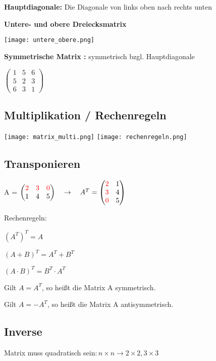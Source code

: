 \begin{multicols*}{3}
    \textbf{Hauptdiagonale:} Die Diagonale von links oben nach rechts unten

    \textbf{Untere- und obere Dreiecksmatrix}

    \texttt{[image: untere\_obere.png]}

    \textbf{Symmetrische Matrix :} symmetrisch bzgl. Hauptdiagonale

    $ \begin{pmatrix}
            1 & 5 & 6 \\
            5 & 2 & 3 \\
            6 & 3 & 1
        \end{pmatrix} $

    \WhiteSpace
    \subsection{Multiplikation / Rechenregeln}
    {\begin{multicols}{2}
            { \texttt{[image: matrix\_multi.png]} }
            \columnbreak
            { \texttt{[image: rechenregeln.png]} }
        \end{multicols}}

    \subsection{Transponieren}

    A = $\begin{pmatrix} {\color{red}2} & {\color{red}3} & {\color{red}0} \\ 1 & 4 & 5 \end{pmatrix} \quad
        \rightarrow
        \quad A^{T} = \begin{pmatrix} {\color{red}2} & 1 \\ {\color{red}3} & 4 \\ {\color{red}0} & 5 \end{pmatrix}
    $

    {Rechenregeln:}

    $ \left(A^{T}\right)^{T} = A $

    $ \left(A + B\right)^{T} = A^{T} + B^{T} $

    $ \left(A \cdot B\right)^{T} = B^{T} \cdot A^{T} $

    {Gilt $ A = A^{T} $, so heißt die Matrix A symmetrisch.}


    {Gilt $ A = -A^{T} $, so heißt die Matrix A antisymmetrisch.}
    \vfill\null
    \columnbreak
    \subsection{Inverse}
    {Matrix muss quadratisch sein$: n \times n \rightarrow 2\times2, 3\times3$}


\end{multicols*}
